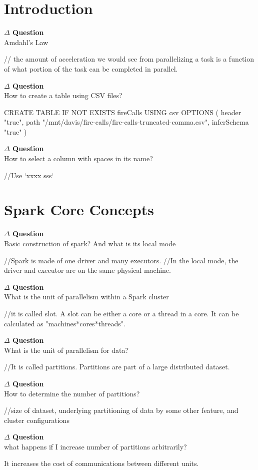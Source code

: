 \documentclass[12pt]{article}
\newenvironment{que}
    { \begin{mdframed}[backgroundcolor=green!20] \textbf{$\Delta$ Question} \\}
    {  \end{mdframed}}
\begin{document}
\section{Introduction}
\begin{que}
Amdahl's Law
\end{que}
\begin{code}
// the amount of acceleration we would see from parallelizing a task is a function of what portion of the task can be completed in parallel.
\end{code}

\begin{que}
How to create a table using CSV files?
\end{que}
\begin{code}
CREATE TABLE IF NOT EXISTS fireCalls
USING csv
OPTIONS (
  header "true",
  path "/mnt/davis/fire-calls/fire-calls-truncated-comma.csv",
  inferSchema "true"
)
\end{code}
\begin{que}
How to select a column with spaces in its name?
\end{que}
\begin{code}
//Use `xxxx sss`
\end{code}
\section{Spark Core Concepts}
\begin{que}
Basic construction of spark? And what is its local mode
\end{que}
\begin{code}
//Spark is made of one driver and many executors.
//In the local mode, the driver and executor are on the same physical machine.
\end{code}
\begin{que}
What is the unit of parallelism within a Spark cluster
\end{que}
\begin{code}
//it is called slot. A slot can be either a core or a thread in a core. It can be calculated as "machines*cores*threads".
\end{code}
\begin{que}
What is the unit of parallelism for data?
\end{que}
\begin{code}
//It is called partitions. Partitions are part of a large distributed dataset.
\end{code}
\begin{que}
How to determine the number of partitions?
\end{que}
\begin{code}
//size of dataset, underlying partitioning of data by some other feature, and cluster configurations 
\end{code}
\begin{que}
what happens if I increase number of partitions arbitrarily?
\end{que}
\begin{code}
It increases the cost of communications between different units.
\end{code}
\end{document}
